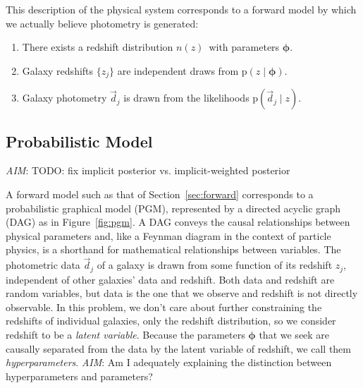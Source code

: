 \documentclass[iop]{emulateapj}
\newcommand{\todo}[3]{{\color{#2}\emph{#1}: #3}}
\newcommand{\aim}[1]{\todo{AIM}{red}{#1}}
\newcommand{\Sect}[1]{Section~\ref{#1}}
\newcommand{\Fig}[1]{Figure~\ref{#1}}
\newcommand{\nz}{$n(z)$}
\newcommand{\data}{\ensuremath{\vec{d}}}
\newcommand{\pr}[1]{\ensuremath{\mathrm{p}(#1)}}
\newcommand{\gvn}{\mid}%
\newcommand{\bvec}[1]{\ensuremath{\boldsymbol{#1}}}
\newcommand{\ndphi}{\bvec{\phi}}
\begin{document}
This description of the physical system corresponds to a forward model by which we actually believe photometry is generated:
\begin{enumerate}
	\item There exists a redshift distribution \nz\ with parameters $\ndphi$.
	\item Galaxy redshifts $\{z_{j}\}$ are independent draws from $\pr{z \gvn \ndphi}$.
	\item Galaxy photometry $\data_{j}$ is drawn from the likelihoods $\pr{\data_{j} \gvn z}$.
\end{enumerate}

\subsection{Probabilistic Model}
\label{sec:prob}

\aim{TODO: fix implicit posterior vs. implicit-weighted posterior}

A forward model such as that of \Sect{sec:forward} corresponds to a probabilistic graphical model (PGM), represented by a directed acyclic graph (DAG) as in \Fig{fig:pgm}.
A DAG conveys the causal relationships between physical parameters and, like a Feynman diagram in the context of particle physics, is a shorthand for mathematical relationships between variables.
The photometric data $\data_{j}$ of a galaxy is drawn from some function of its redshift $z_{j}$, independent of other galaxies' data and redshift.
Both data and redshift are random variables, but data is the one that we observe and redshift is not directly observable.
In this problem, we don't care about further constraining the redshifts of individual galaxies, only the redshift distribution, so we consider redshift to be a \textit{latent variable}.
Because the parameters $\ndphi$ that we seek are causally separated from the data by the latent variable of redshift, we call them \textit{hyperparameters}.
\aim{Am I adequately explaining the distinction between hyperparameters and parameters?}
\end{document}
